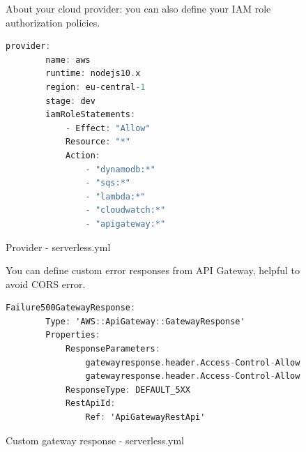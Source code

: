 \begin{figure} [H]
About your cloud provider: you can also define your IAM role authorization policies.
\begin{lstlisting}[language=C]
	provider:
		name: aws
		runtime: nodejs10.x
		region: eu-central-1
		stage: dev
		iamRoleStatements:
			- Effect: "Allow"
			Resource: "*"
			Action:
				- "dynamodb:*"
				- "sqs:*"
				- "lambda:*"
				- "cloudwatch:*"
				- "apigateway:*"
\end{lstlisting}
	\caption{Provider - serverless.yml}\label{}
\end{figure}

\begin{figure} [H]
You can define custom error responses from API Gateway, helpful to avoid CORS error.
\begin{lstlisting}[language=C]
	Failure500GatewayResponse:
		Type: 'AWS::ApiGateway::GatewayResponse'
		Properties:
			ResponseParameters:
				gatewayresponse.header.Access-Control-Allow-Origin: "'*'"
				gatewayresponse.header.Access-Control-Allow-Headers: "'*'"
			ResponseType: DEFAULT_5XX
			RestApiId:
				Ref: 'ApiGatewayRestApi'
\end{lstlisting}
	\caption{Custom gateway response - serverless.yml}\label{}
\end{figure}

